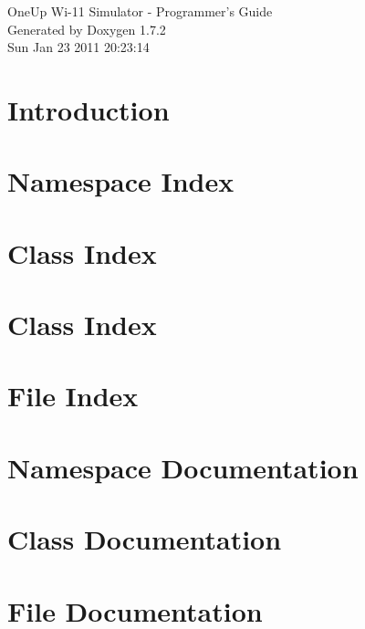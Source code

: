 \documentclass[letterpaper]{book}
\begin{document}
\hypersetup{pageanchor=false}
\begin{titlepage}
\vspace*{7cm}
\begin{center}
{\Large OneUp Wi-\/11 Simulator -\/ Programmer's Guide }\\
\vspace*{1cm}
{\large Generated by Doxygen 1.7.2}\\
\vspace*{0.5cm}
{\small Sun Jan 23 2011 20:23:14}\\
\end{center}
\end{titlepage}
\clearemptydoublepage
{}
\tableofcontents
\clearemptydoublepage
{}
\hypersetup{pageanchor=true}
\chapter{Introduction}
\label{index}\hypertarget{index}{}
\chapter{Namespace Index}

\chapter{Class Index}

\chapter{Class Index}

\chapter{File Index}

\chapter{Namespace Documentation}


\chapter{Class Documentation}


















\chapter{File Documentation}
















\printindex
\end{document}
